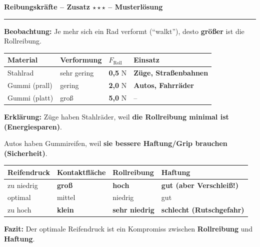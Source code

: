 \documentclass[11pt,a4paper]{article}
\newcommand{\lsg}[1]{\textcolor{loesung}{\textbf{#1}}}
\newcommand{\stern}[1]{\textcolor{merkerand}{\textbf{#1}}}
\begin{document}
{\Large\bfseries Reibungskräfte -- Zusatz \stern{$\star\star\star$} -- \textcolor{loesung}{Musterlösung}}\\[0.2em]
\hrule
\vspace{0.4em}

\begin{protokollbox}[title=B5: Rollreibung -- Warum Stahlräder bei Zügen?]
\small
\textbf{Beobachtung:} Je mehr sich ein Rad verformt (``walkt''), desto \lsg{größer} ist die Rollreibung.

\vspace{0.3em}
\renewcommand{\arraystretch}{1.3}
\begin{tabular}{|p{3cm}|p{2.5cm}|p{2.5cm}|p{4cm}|}
\hline
\textbf{Material} & \textbf{Verformung} & \textbf{$F_{\text{Roll}}$} & \textbf{Einsatz} \\
\hline
Stahlrad & sehr gering & \lsg{0,5} N & \lsg{Züge, Straßenbahnen} \\
\hline
Gummi (prall) & gering & \lsg{2,0} N & \lsg{Autos, Fahrräder} \\
\hline
Gummi (platt) & groß & \lsg{5,0} N & -- \\
\hline
\end{tabular}

\vspace{0.3em}
\textbf{Erklärung:} Züge haben Stahlräder, weil \lsg{die Rollreibung minimal ist (Energiesparen)}.

Autos haben Gummireifen, weil \lsg{sie bessere Haftung/Grip brauchen (Sicherheit)}.
\end{protokollbox}

\vspace{0.3em}

\begin{protokollbox}[title=B6: Reifendruck und Haftung]
\small
\renewcommand{\arraystretch}{1.3}
\begin{tabular}{|p{3cm}|p{2.5cm}|p{2.5cm}|p{3.5cm}|}
\hline
\textbf{Reifendruck} & \textbf{Kontaktfläche} & \textbf{Rollreibung} & \textbf{Haftung} \\
\hline
zu niedrig & \lsg{groß} & \lsg{hoch} & \lsg{gut (aber Verschleiß!)} \\
\hline
optimal & mittel & niedrig & gut \\
\hline
zu hoch & \lsg{klein} & \lsg{sehr niedrig} & \lsg{schlecht (Rutschgefahr)} \\
\hline
\end{tabular}

\vspace{0.3em}
\textbf{Fazit:} Der optimale Reifendruck ist ein Kompromiss zwischen \lsg{Rollreibung} und \lsg{Haftung}.
\end{protokollbox}
\end{document}
